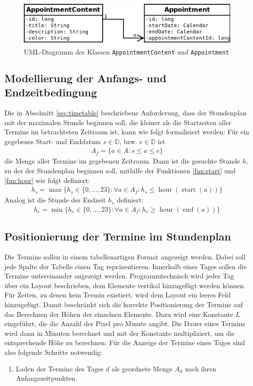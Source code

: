 \documentclass[noindent]{tudreport}
\DeclareMathOperator{\start}{start}
\DeclareMathOperator{\getEnd}{end}
\DeclareMathOperator{\hour}{hour}
\begin{document}
			\begin{figure}[h]
				\centering
				\includegraphics[scale=0.5]{img/uml_appointment.png}
				\caption{UML-Diagramm der Klassen \lstinline!AppointmentContent! und \lstinline!Appointment!}
				\label{fig:uml_appointment}
			\end{figure}
			
			\subsection{Modellierung der Anfangs- und Endzeitbedingung}
				Die in Abschnitt \ref{sec:timetable} beschriebene Anforderung, dass der Stundenplan mit der maximalen Stunde beginnen soll, die kleiner als die Startzeiten aller Termine im betrachteten Zeitraum ist, kann wie folgt formalisiert werden: Für ein gegebenes Start- und Enddatum $s \in \mathbb{D}$, bzw. $e \in \mathbb{D}$ ist
				\begin{align}
A_f = \{a \in A: s \leq a \leq e\}
				\end{align}
				die Menge aller Termine im gegebenen Zeitraum. Dann ist die gesuchte Stunde $h$, zu der der Stundenplan beginnen soll, mithilfe der Funktionen \ref{fun:start} und \ref{fun:hour} wie folgt definiert:
				\begin{align}
h_s = \max\{h_s \in \{0, \dots, 23\}: \forall a \in A_f: h_s \leq \hour(\start(a)) \}
				\end{align}
				Analog ist die Stunde der Endzeit $h_e$ definiert:
				\begin{align}
h_e = \min\{h_e \in \{0, \dots, 23\}: \forall a \in A_f: h_e \geq \hour(\getEnd(a)) \}
				\end{align}
			
			\subsection{Positionierung der Termine im Stundenplan}
				Die Termine sollen in einem tabellenartigen Format angezeigt werden. Dabei soll jede Spalte der Tabelle einen Tag repräsentieren. Innerhalb eines Tages sollen die Termine untereinander angezeigt werden. Programmtechnisch wird jeder Tag über ein Layout beschrieben, dem Elemente vertikal hinzugefügt werden können. Für Zeiten, zu denen kein Termin existiert, wird dem Layout ein leeres Feld hinzugefügt. Damit beschränkt sich die korrekte Positionierung der Termine auf das Berechnen der Höhen der einzelnen Elemente. Dazu wird eine Konstante $L$ eingeführt, die die Anzahl der Pixel pro Minute angibt. Die Dauer eines Termins wird dann in Minuten berechnet und mit der Konstante multipliziert, um die entsprechende Höhe zu berechnen. Für die Anzeige der Termine eines Tages sind also folgende Schritte notwendig:
				\begin{enumerate}
					\item Laden der Termine des Tages $d$ als geordnete Menge $A_d$ nach ihren Anfangszeitpunkten.
				\end{enumerate}
\end{document}
